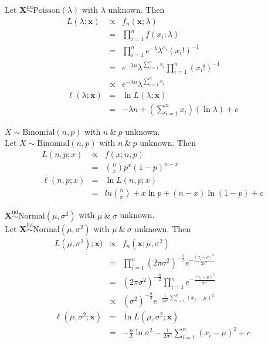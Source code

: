 \documentclass[11pt,a4paper]{article}
\begin{document}
\apart
Let $\textbf{X}\overset{\mathrm{iid}}{\sim}\mathrm{Poisson}(\lambda)$ with $\lambda$ unknown. Then
\[\begin{array}{rcl}
L(\lambda;\textbf{x})&\propto&f_n(\textbf{x};\lambda)\\
&=&\prod\limits_{i=1}^nf(x_i;\lambda)\\
&=&\prod\limits_{i=1}^ne^{-\lambda}\lambda^{x_i}(x_i!)^{-1}\\
&=& e^{-\lambda n}\lambda^{\sum_{i=1}^n x_i}\prod\limits_{i=1}^n(x_i!)^{-1}\\
&\propto&e^{-\lambda n}\lambda^{\sum_{i=1}^n x_i}\\
\ell(\lambda;\textbf{x})&=&\ln L(\lambda;\textbf{x})\\
&=&-\lambda n+\left(\sum\limits_{i=1}^nx_i\right)(\ln\lambda)+c
\end{array}\]

\qpartnb $X\sim\mathrm{Binomial}(n,p)$ with $n\ \&\ p$ unknown.\\

\apart
Let $X\sim\mathrm{Binomial}(n,p)$ with $n\ \&\ p$ unknown. Then
\[\begin{array}{rcl}
L(n,p;x)&\propto&f(x;n,p)\\
&=&{n \choose x}p^x(1-p)^{n-x}\\
\ell(n,p;x)&=&\ln L(n,p;x)\\
&=&ln{n \choose x} + x\ln p + (n-x)\ln(1-p)+c
\end{array}\]

\newpage
\qpartnb $\textbf{X}\overset{\mathrm{iid}}{\sim}\mathrm{Normal}(\mu,\sigma^2)$ with $\mu\ \&\ \sigma$ unknown.\\

\apart
Let $\textbf{X}\overset{\mathrm{iid}}{\sim}\mathrm{Normal}(\mu,\sigma^2)$ with $\mu\ \&\ \sigma$ unknown. Then
\[\begin{array}{rcl}
L(\mu,\sigma^2);\textbf{x})&\propto&f_n(\textbf{x};\mu,\sigma^2)\\
&=&\prod\limits_{i=1}^n (2\pi\sigma^2)^{-\frac{1}{2}} e^{-\frac{(x_i-\mu)^2}{2\sigma^2}}\\
&=&(2\pi\sigma^2)^{-\frac{n}{2}}\prod\limits_{i=1}^n e^{-\frac{(x_i-\mu)^2}{2\sigma^2}}\\
&\propto&(\sigma^2)^{-\frac{n}{2}} e^{-\frac{1}{2\sigma^2}\sum\limits_{i=1}^n(x_i-\mu)^2}\\
\ell(\mu,\sigma^2;\textbf{x})&=&\ln L(\mu,\sigma^2;\textbf{x})\\
&=&-\frac{n}{2}\ln\sigma^2 -\frac{1}{2\sigma^2}\sum\limits_{i=1}^n(x_i-\mu)^2+c
\end{array}\]
\end{document}
